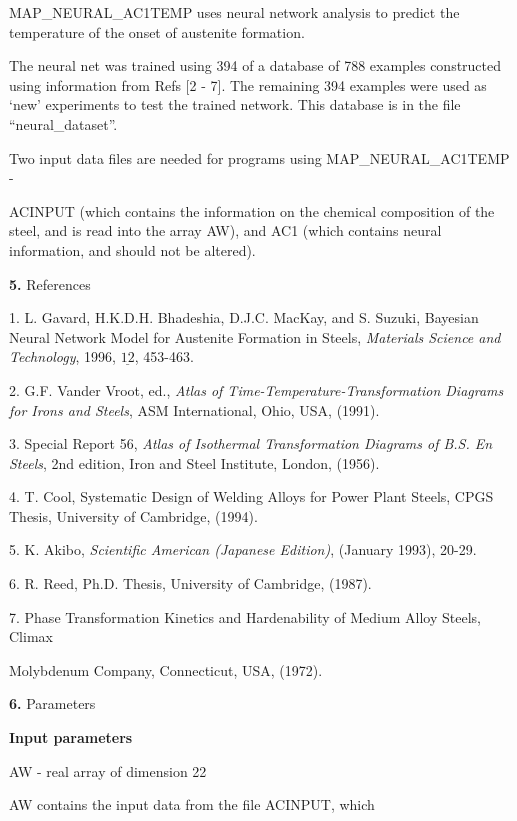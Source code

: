 \bigskip
\item {} MAP\_NEURAL\_AC1TEMP uses neural network analysis to predict the
temperature of the onset of austenite formation.
\medskip
\item {} The neural net was trained using 394 of a database of 788 examples
constructed using information from Refs [2 - 7]. The remaining 394 examples
were used as `new' experiments to test the trained network. This database
is in the file ``neural\_dataset''.
\medskip
\item {} Two input data files are needed for programs using MAP\_NEURAL\_AC1TEMP -
\item {} ACINPUT (which contains the information on the chemical composition of the
steel, and is read into the array AW), and AC1 (which contains neural information,
and should not be altered).
\item{\bf 5.} {\largeb  References}
\bigskip
\item {} 1. L. Gavard, H.K.D.H. Bhadeshia, D.J.C. MacKay, and S. Suzuki,
 Bayesian Neural Network Model for Austenite Formation in Steels,
{\it Materials Science and Technology}, 1996, $\underline {12}$, 453-463.
\medskip
\item {} 2. G.F. Vander Vroot, ed., {\it Atlas of 
Time-Temperature-Transformation Diagrams for Irons and Steels}, ASM 
International, Ohio, USA, (1991).
\medskip
\item {} 3. Special Report 56, {\it Atlas of Isothermal Transformation
Diagrams of B.S. En Steels}, 2nd edition, Iron and Steel Institute, London,
(1956).
\medskip
\item {} 4. T. Cool, Systematic Design of Welding Alloys for Power Plant
Steels, CPGS Thesis, University of Cambridge, (1994).
\medskip
\item {} 5. K. Akibo, {\it Scientific American (Japanese Edition)},
(January 1993), 20-29.
\medskip
\item {} 6. R. Reed, Ph.D. Thesis, University of Cambridge, (1987).
\medskip
\item {} 7. Phase Transformation Kinetics and Hardenability of Medium Alloy
Steels, Climax \item {} Molybdenum Company, Connecticut, USA, (1972).
\item{\bf 6.} {\largeb  Parameters}
\bigskip
\item {} {\bf Input parameters}
\bigskip
\item {} AW - real array of dimension 22
\item {} \indent AW contains the input data from the file ACINPUT, which
